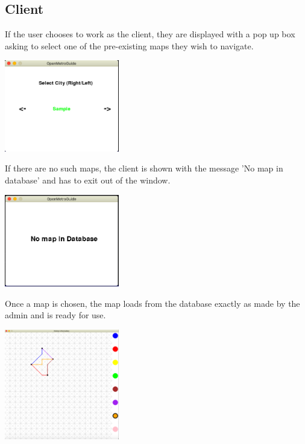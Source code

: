 \documentclass[fontsize=11pt]{article}
\begin{document}
    \subsection*{Client}
    If the user chooses to work as the client, they are displayed with a pop up box asking to select one of the pre-existing maps they wish to navigate.\\
    \begin{center}
        \includegraphics[width = 5cm]{client select city.png}\\
    \end{center}
    If there are no such maps, the client is shown with the message 'No map in database' and has to exit out of the window.\\
    \begin{center}
        \includegraphics[width = 5cm]{no maps in database.png}\\
    \end{center}
    Once a map is chosen, the map loads from the database exactly as made by the admin and is ready for use.\\
    \begin{center}
        \includegraphics[width = 5cm]{Sample Map.png}\\
    \end{center}
\end{document}
